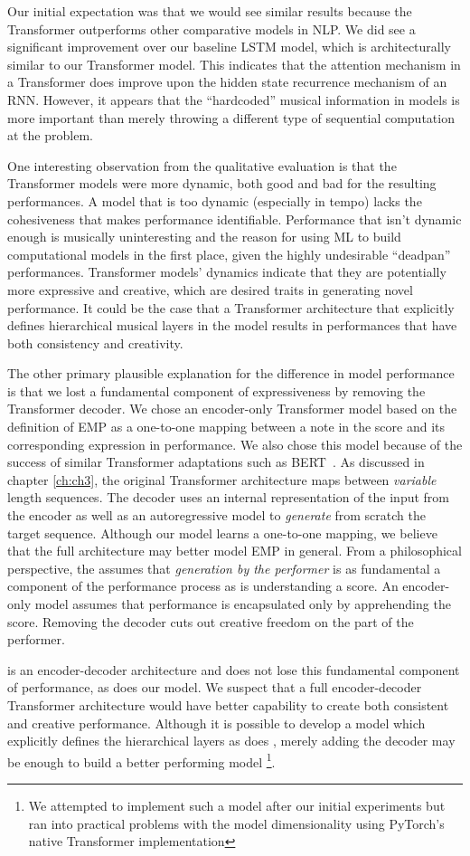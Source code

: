 Our initial expectation was that we would see similar results because the Transformer outperforms other comparative models in NLP. We did see a significant improvement over our baseline LSTM model, which is architecturally similar to our Transformer model. This indicates that the attention mechanism in a Transformer does improve upon the hidden state recurrence mechanism of an RNN. However, it appears that the ``hardcoded'' musical information in \vnet{} models is more important than merely throwing a different type of sequential computation at the problem.

One interesting observation from the qualitative evaluation is that the Transformer models were more dynamic, both good and bad for the resulting performances. A model that is too dynamic (especially in tempo) lacks the cohesiveness that makes performance identifiable. Performance that isn't dynamic enough is musically uninteresting and the reason for using ML to build computational models in the first place, given the highly undesirable ``deadpan'' performances. Transformer models' dynamics indicate that they are potentially more expressive and creative, which are desired traits in generating novel performance. It could be the case that a Transformer architecture that explicitly defines hierarchical musical layers in the model results in performances that have both consistency and creativity. 

The other primary plausible explanation for the difference in model performance is that we lost a fundamental component of expressiveness by removing the Transformer decoder. We chose an encoder-only Transformer model based on the \vnetf{} definition of EMP as a one-to-one mapping between a note in the score and its corresponding expression in performance. We also chose this model because of the success of similar Transformer adaptations such as BERT~\cite{devlin2018bert}. As discussed in chapter \ref{ch:ch3}, the original \ed{} Transformer architecture maps between \emph{variable} length sequences. The decoder uses an internal representation of the input from the encoder as well as an autoregressive model to \emph{generate} from scratch the target sequence. Although our model learns a one-to-one mapping, we believe that the full \ed{} architecture may better model EMP in general. From a philosophical perspective, the \ed{} assumes that \emph{generation by the performer} is as fundamental a component of the performance process as is understanding a score. An encoder-only model assumes that performance is encapsulated only by apprehending the score. Removing the decoder cuts out creative freedom on the part of the performer.

\vnet{} is an encoder-decoder architecture and does not lose this fundamental component of performance, as does our model. We suspect that a full encoder-decoder Transformer architecture would have better capability to create both consistent and creative performance. Although it is possible to develop a model which explicitly defines the hierarchical layers as does \vnet{}, merely adding the decoder may be enough to build a better performing model%
\footnote{We attempted to implement such a model after our initial experiments but ran into practical problems with the model dimensionality using PyTorch's native Transformer implementation}. 
